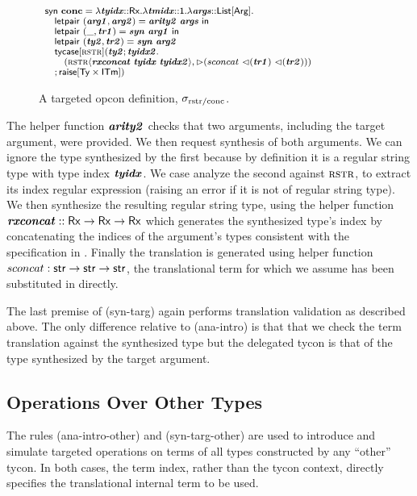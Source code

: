 \documentclass[pldi]{sigplanconf-pldi15}
\begin{document}
\begin{figure}[t]
$\small\begin{array}{l}
\keyw{syn}~\opname{conc}=\slam{\krx}{\svar{tyidx}}{
    \slam{\kunit}{\svar{tmidx}}{
        \slam{\kargs}{\svar{args}}{\\
            \quad \keyw{letpair}~(\svar{arg1}, \svar{arg2}) = \svar{arity2}~\svar{args}~\keyw{in}\\
            \quad \keyw{letpair}~(\_, \svar{tr1}) = \svar{syn}~\svar{arg1}~\keyw{in}~  \\\quad\keyw{letpair}~(\svar{ty2}, \svar{tr2}) = \svar{syn}~\svar{arg2}\\
            \quad \stycase{\tcvar{rstr}}{\svar{ty2}}{\svar{tyidx2}}{\\
                \quad\quad (\sty{\tcvar{rstr}}{\svar{rxconcat}~\svar{tyidx}~\svar{tyidx2}}, \sqitm{sconcat~\quq{\svar{tr1}}~\quq{\svar{tr2}}})\\
                \quad
            }{\sraise{\kty\times\kitm}}
        }
    }
}
\end{array}
$
\caption{A targeted opcon definition, $\sigma_\text{rstr/conc}$.}
\label{fig:example-conc}
\vspace{-8px}
\end{figure}
The helper function ${\textbf{\textit{arity2}}}$ checks that two arguments, including the target argument, were provided. We then request synthesis of both arguments. We can ignore the type synthesized by the first because by definition it is a regular string type with type index ${\textbf{\textit{tyidx}}}$. We case analyze the second against $\textsc{rstr}$, to extract its index regular expression (raising an error if it is not of regular string type). We then synthesize the resulting regular string type, using the helper function ${\textbf{\textit{rxconcat}}} :: {\sf Rx} \rightarrow {\sf Rx} \rightarrow {\sf Rx}$ which generates the synthesized type's  index by concatenating the indices of the argument's types consistent with the specification in \cite{sanitation-psp14}. Finally the translation is generated using helper function $sconcat : {\sf str} \rightarrow {\sf str} \rightarrow {\sf str}$, the translational term for which we assume has been substituted in directly.

The last premise of (syn-targ) again performs translation validation as described above. The only difference relative to (ana-intro) is that that we check the term translation against the synthesized type but the delegated tycon is that of the type synthesized by the target argument.

\subsection{Operations Over Other Types}
\noindent
The rules (ana-intro-other) and (syn-targ-other) are used to introduce and simulate targeted operations on terms of all types constructed by any ``other'' tycon. In both cases, the term index, rather than the tycon context, directly specifies the translational internal term to be used. %
\end{document}
